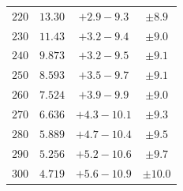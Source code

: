 \begin{table}
\begin{center}
\begin{tabular}{cccc}
$220 $&$ 13.30 $&$ +2.9  -\!9.3  $&$ \pm 8.9  $\\
$230 $&$ 11.43 $&$ +3.2  -\!9.4  $&$ \pm 9.0  $\\
$240 $&$ 9.873 $&$ +3.2  -\!9.5  $&$ \pm 9.1  $\\
$250 $&$ 8.593 $&$ +3.5  -\!9.7  $&$ \pm 9.1  $\\
$260 $&$ 7.524 $&$ +3.9  -\!9.9  $&$ \pm 9.0  $\\
$270 $&$ 6.636 $&$ +4.3  -\!10.1 $&$ \pm 9.3  $\\
$280 $&$ 5.889 $&$ +4.7  -\!10.4 $&$ \pm 9.5  $\\
$290 $&$ 5.256 $&$ +5.2  -\!10.6 $&$ \pm 9.7  $\\
$300 $&$ 4.719 $&$ +5.6  -\!10.9 $&$ \pm 10.0 $\\ \hline
   \end{tabular}
   \end{center}
\end{table}
  
